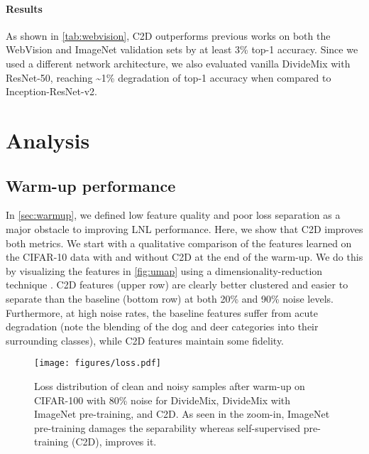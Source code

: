 \documentclass[10pt,twocolumn,letterpaper]{article}
\renewcommand{\cite}[1]{\citep{#1}}
\begin{document}
\paragraph{Results}
As shown in \cref{tab:webvision}, C2D outperforms previous works on both the WebVision and ImageNet validation  sets by at least 3\% top-1 accuracy. Since we used a different network architecture, we also evaluated vanilla DivideMix with ResNet-50, reaching \textasciitilde1\% degradation of top-1 accuracy when compared to Inception-ResNet-v2.
 \section {Analysis}
\label{sec:analysis}





\subsection{Warm-up performance}
\label{subsec:warmup}
In \cref{sec:warmup}, we defined low feature quality and poor loss separation as a major obstacle to improving LNL performance. Here, we show that C2D improves both metrics.
We start with a qualitative comparison of the features learned on the CIFAR-10 data with and without C2D at the end of the warm-up. We do this by visualizing the features in \cref{fig:umap} using a dimensionality-reduction technique \cite{lel2018umap}. C2D features (upper row) are clearly better clustered and easier to separate than the baseline (bottom row) at both 20\% and 90\% noise levels. 
Furthermore, at high noise rates, the baseline features suffer from acute degradation (note the blending of the dog and deer categories into their surrounding classes), while C2D features maintain some fidelity.    



\begin{figure*}
\centering
        \texttt{[image: figures/loss.pdf]}
 \caption{Loss distribution of clean and noisy samples after warm-up on CIFAR-100 with 80\% noise for DivideMix, DivideMix with ImageNet pre-training, and C2D. As seen in the zoom-in, ImageNet pre-training damages the separability whereas self-supervised pre-training (C2D), improves it. }
\label{fig:loss_distribution}
\end{figure*}
\end{document}
